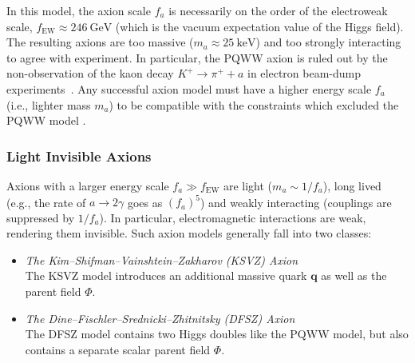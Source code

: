 In this model, the axion scale $f_a$ is necessarily on the order of the electroweak scale, $f_\text{EW} \approx \SI{246}{\giga\eV}$ (which is the vacuum expectation value of the Higgs field).
The resulting axions are too massive ($m_a \approx \SI{25}{\kilo\eV}$) and too strongly interacting to agree with experiment.
In particular, the PQWW axion is ruled out by the non-observation of the kaon decay $K^+ \to π^+ + a$ in electron beam-dump experiments\footnotemark\ \cite{Peccei_1996,riordan1987search}.
Any successful axion model must have a higher energy scale $f_a$ (i.e., lighter mass $m_a$) to be compatible with the constraints which excluded the PQWW model \cite{Marsh_2016}.


\subsubsection{Light Invisible Axions}

Axions with a larger energy scale $f_a \gg f_\text{EW}$ are light ($m_a \sim 1/f_a$), long lived (e.g., the rate of $a \to 2γ$ goes as $(f_a)^5$) and weakly interacting (couplings are suppressed by $1/f_a$).
In particular, electromagnetic interactions are weak, rendering them invisible.
Such axion models generally fall into two classes: \cite{Peccei_1996,Marsh_2016}
\begin{itemize}
	\item \textit{The Kim--Shifman--Vainshtein--Zakharov (KSVZ) Axion} \\
	The KSVZ model introduces an additional massive quark $\bm q$ as well as the parent field $Φ$.
	\item \textit{The Dine--Fischler--Srednicki--Zhitnitsky (DFSZ) Axion} \\
	The DFSZ model contains two Higgs doubles like the PQWW model, but also contains a separate scalar parent field $Φ$.
\end{itemize}
